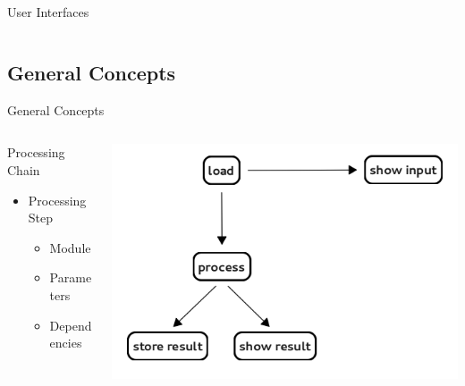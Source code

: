 \documentclass{beamer}
\begin{document}
\begin{frame}[t]{User Interfaces}
\begin{columns}
\begin{column}[t]{.5\textwidth}
\begin{center}
			\end{center}
		\end{column}
	\end{columns}


\end{frame}

\subsection{General Concepts}
\begin{frame}{General Concepts}

	\begin{columns}
		\begin{column}[t]{.4\textwidth}
\Large
			Processing Chain
			\vspace{.4cm}\pause
\Large
			\begin{itemize}
				\item<2->[$\rightarrow$] Processing Step
				\vspace{.25cm}
				\large
				\begin{itemize}
					\item<3->[$\rightarrow$] Module
				\vspace{.25cm}
					\item<4->[$\rightarrow$] Parameters
				\vspace{.25cm}
					\item<5->[$\rightarrow$] Dependencies
				\end{itemize}
			\end{itemize}

		\end{column}
		\begin{column}[t]{.6\textwidth}
			\begin{center}

				\includegraphics[width=\textwidth]{images/intro/simpleChain}


\end{center}
\end{column}
\end{columns}
\end{frame}
\end{document}

